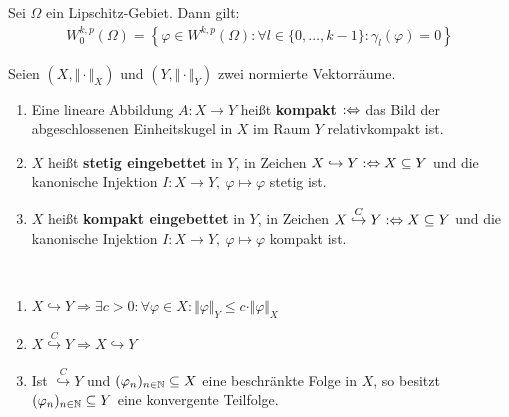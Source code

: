 \begin{satz}
Sei $\Omega$ ein Lipschitz-Gebiet. Dann gilt:
\begin{align*}
W_0^{k,p}(\Omega)=\left\lbrace\varphi\in W^{k,p}(\Omega):
\forall l\in\lbrace0,\ldots,k-1\rbrace:\gamma_l(\varphi)=0\right\rbrace
\end{align*}
\end{satz}

\begin{definition}
Seien $(X,\Vert\cdot\Vert_X)$ und $(Y,\Vert\cdot\Vert_Y)$ zwei normierte Vektorräume.
\begin{enumerate}
\item Eine lineare Abbildung $A:X\to Y$ heißt \textbf{kompakt} $:\Leftrightarrow$ das Bild der abgeschlossenen Einheitskugel in $X$ im Raum $Y$ relativkompakt ist.
\item $X$ heißt \textbf{stetig eingebettet} in $Y$, in Zeichen $X\hookrightarrow Y:\Leftrightarrow X\subseteq Y$ und die kanonische Injektion $I:X\to Y,~\varphi\mapsto\varphi$ stetig ist.
\item $X$ heißt \textbf{kompakt eingebettet} in $Y$, in Zeichen $X\stackrel{C}{\hookrightarrow} Y:\Leftrightarrow X\subseteq Y$ und die kanonische Injektion $I:X\to Y,~\varphi\mapsto\varphi$ kompakt ist.
\end{enumerate}
\end{definition}

\begin{bemerkung}\
\begin{enumerate}
\item $X\hookrightarrow Y\Longrightarrow\exists c>0:\forall\varphi\in X:\Vert\varphi\Vert_Y\leq c\cdot\Vert\varphi\Vert_X$
\item $X\stackrel{C}{\hookrightarrow} Y\Longrightarrow X\hookrightarrow Y$
\item Ist $\stackrel{C}{\hookrightarrow} Y$ und $(\varphi_n)_{n\in\mathbb{N}}\subseteq X$ eine beschränkte Folge in $X$, so besitzt $(\varphi_n)_{n\in\mathbb{N}}\subseteq Y$ eine konvergente Teilfolge.
\end{enumerate}
\end{bemerkung}

